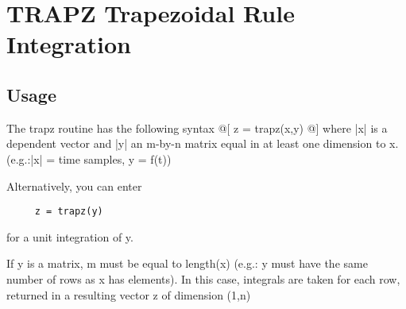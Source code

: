 \section{TRAPZ Trapezoidal Rule Integration}

\subsection{Usage}

 The trapz routine has the following syntax
 @[
      z = trapz(x,y)
 @]
 where |x| is a dependent vector and |y| an m-by-n matrix equal in
  at least one dimension to x. (e.g.:|x| = time samples, y = f(t))
 
 Alternatively, you can enter 
\begin{verbatim}
     z = trapz(y) 
\end{verbatim}
 for a unit integration of y. 

 If y is a matrix, m must be equal to length(x) (e.g.:
 y must have the same number of rows as x has elements).
 In this case, integrals are taken for each row, returned in a
 resulting vector z of dimension (1,n)
